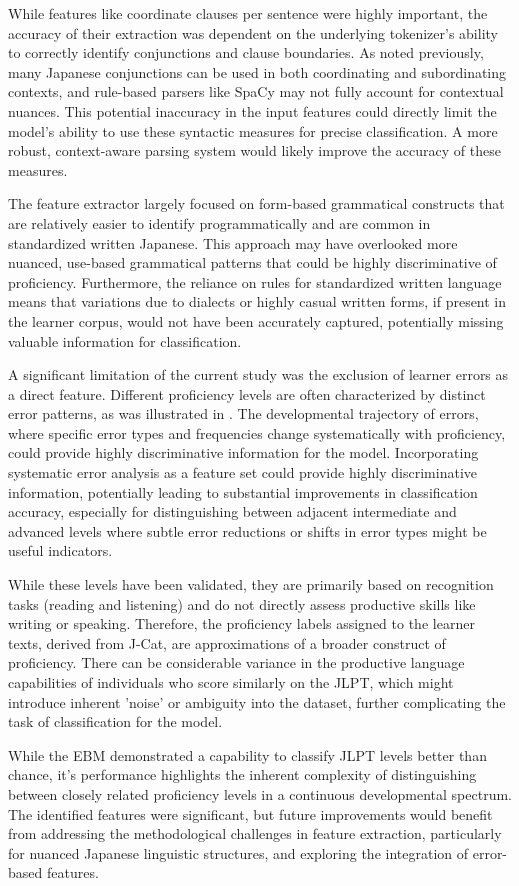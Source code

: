 While features like coordinate clauses per sentence were highly important, the accuracy of their extraction was
dependent on the underlying tokenizer's ability to correctly identify conjunctions and clause boundaries. As noted
previously, many Japanese conjunctions can be used in both coordinating and subordinating contexts, and rule-based
parsers like SpaCy may not fully account for contextual nuances. This potential inaccuracy in the input features
could directly limit the model's ability to use these syntactic measures for precise classification. A more robust,
context-aware parsing system would likely improve the accuracy of these measures.

The feature extractor largely focused on form-based grammatical constructs that are relatively easier to identify
programmatically and are common in standardized written Japanese. This approach may have overlooked more nuanced,
use-based grammatical patterns that could be highly discriminative of proficiency.
Furthermore, the
reliance on rules
for standardized written language means that variations due to dialects or highly casual written forms, if present
in the learner corpus, would not have been accurately captured, potentially missing valuable information for
classification.

A significant limitation of the current study was the exclusion of learner errors as a direct feature. Different
proficiency levels are often
characterized by distinct error patterns, as was illustrated in \citet{Hawkins_Buttery_2010}. The
developmental trajectory of errors, where specific error types and frequencies change systematically with
proficiency, could provide highly discriminative information for the model.
Incorporating
systematic error analysis as a
feature
set
could provide
highly discriminative information, potentially leading to substantial improvements in classification accuracy,
especially for distinguishing between adjacent intermediate and advanced levels where subtle error reductions or
shifts in error types might be useful indicators.

While these levels have been validated\citet{jcat_interpretation_guide}, they
are primarily based on recognition tasks (reading and listening) and do not directly assess productive skills like
writing or speaking. Therefore, the proficiency labels assigned to the learner texts, derived from J-Cat, are approximations of a broader construct of proficiency. There can be considerable variance in the productive language capabilities of individuals who score similarly on the JLPT, which might introduce inherent 'noise' or ambiguity into the dataset, further complicating the task of classification for the model.

While the EBM demonstrated a capability to classify JLPT levels better than chance, it's performance highlights the
inherent
complexity of distinguishing between closely related proficiency levels in a continuous developmental spectrum. The
identified features were significant, but future improvements would benefit from addressing the methodological
challenges in feature extraction, particularly for nuanced Japanese linguistic structures, and exploring the
integration of error-based features.